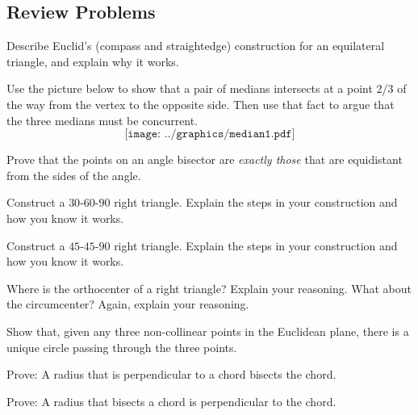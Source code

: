 \subsection*{Review Problems}
\begin{prob}
Describe Euclid's (compass and straightedge) construction for an equilateral triangle, and explain
why it works.
\end{prob}

\begin{prob}
Use the picture below to show that a pair of medians intersects at a point 2/3 of the way from the vertex to the opposite side.  Then use that fact to argue that the three medians must be concurrent.  
$$\texttt{[image: ../graphics/median1.pdf]}$$
\end{prob}

\begin{prob}
Prove that the points on an angle bisector are \emph{exactly those} that are equidistant from the sides of the angle. 
\end{prob}

\begin{prob}
Construct a $30$-$60$-$90$ right triangle. Explain the steps in your
  construction and how you know it works.
\end{prob}

\begin{prob}
Construct a $45$-$45$-$90$ right triangle. Explain the steps in your
  construction and how you know it works.
\end{prob}

\begin{prob}
Where is the orthocenter of a right triangle?  Explain your reasoning.  What about the circumcenter?  Again, explain your reasoning. 
\end{prob}

\begin{prob}
Show that, given any three non-collinear points in the Euclidean plane, there is a unique circle passing through the three points.
\end{prob}

\begin{prob}
Prove: A radius that is perpendicular to a chord bisects the chord. 
\end{prob}

\begin{prob}
Prove:  A radius that bisects a chord is perpendicular to the chord. 
\end{prob}


